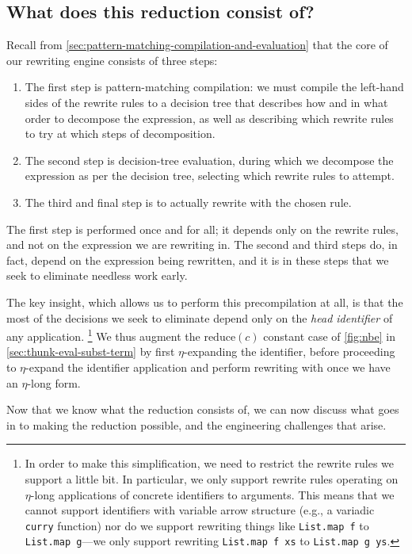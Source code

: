 \subsection{What does this reduction consist of?}\label{sec:rewriting-more:pre-reduction:what-reduction}
Recall from \autoref{sec:pattern-matching-compilation-and-evaluation} that the core of our rewriting engine consists of three steps:
\begin{enumerate}
\item
  The first step is pattern-matching compilation: we must compile the left-hand sides of the rewrite rules to a decision tree that describes how and in what order to decompose the expression, as well as describing which rewrite rules to try at which steps of decomposition.
\item
  The second step is decision-tree evaluation, during which we decompose the expression as per the decision tree, selecting which rewrite rules to attempt.
\item
  The third and final step is to actually rewrite with the chosen rule.
\end{enumerate}
The first step is performed once and for all; it depends only on the rewrite rules, and not on the expression we are rewriting in.
The second and third steps do, in fact, depend on the expression being rewritten, and it is in these steps that we seek to eliminate needless work early.

The key insight, which allows us to perform this precompilation at all, is that the most of the decisions we seek to eliminate depend only on the \emph{head identifier} of any application.%
\footnote{%
  In order to make this simplification, we need to restrict the rewrite rules we support a little bit.
  In particular, we only support rewrite rules operating on $\eta$-long applications of concrete identifiers to arguments.
  This means that we cannot support identifiers with variable arrow structure (e.g., a variadic \texttt{curry} function) nor do we support rewriting things like \texttt{List.map f} to \texttt{List.map g}---we only support rewriting \texttt{List.map f xs} to \texttt{List.map g ys}.%
}
We thus augment the $\text{reduce}(c)$ constant case of \autoref{fig:nbe} in \autoref{sec:thunk-eval-subst-term} by first $\eta$-expanding the identifier, before proceeding to $\eta$-expand the identifier application and perform rewriting with  once we have an $\eta$-long form.

Now that we know what the reduction consists of, we can now discuss what goes in to making the reduction possible, and the engineering challenges that arise.

